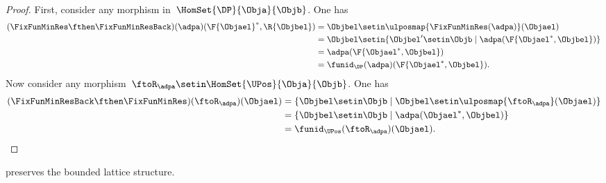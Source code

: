 \begin{proof}
    First, consider any morphism in~$\HomSet{\DP}{\Obja}{\Objb}$.
    One has
    \begin{equation*}
        \begin{aligned}
            (\FixFunMinRes \fthen \FixFunMinResBack)(\adpa)(\F{\Objael}^*,\R{\Objbel})
             & = \Objbel \setin \ulposmap{\FixFunMinRes(\adpa)}(\Objael) \\
             & =\Objbel \setin \{ \Objbel' \setin \Objb \mid \adpa(\F{\Objael^*,\Objbel})\} \\
             & =\adpa(\F{\Objael^*,\Objbel}) \\
             & =\funid_\DP(\adpa)(\F{\Objael^*,\Objbel}).
        \end{aligned}
    \end{equation*}
    Now consider any morphism~$\ftoR_\adpa \setin \HomSet{\UPos}{\Obja}{\Objb}$.
    One has
    \begin{equation*}
        \begin{aligned}
            (\FixFunMinResBack \fthen \FixFunMinRes)(\ftoR_\adpa)(\Objael)
             & =\{ \Objbel \setin \Objb\mid \Objbel \setin \ulposmap{\ftoR_\adpa}(\Objael)\} \\
             & =\{ \Objbel \setin \Objb\mid \adpa(\Objael^*,\Objbel)\} \\
             & =\funid_\UPos(\ftoR_\adpa)(\Objael).
        \end{aligned}
    \end{equation*}

\end{proof}
\begin{lemma}
    \FixFunMinRes preserves the bounded lattice structure.
\end{lemma}
